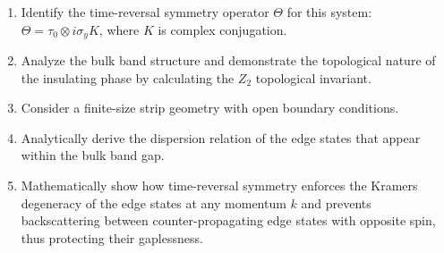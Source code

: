 \documentclass[a4paper,12pt]{article}
\begin{document}
\begin{enumerate}
    \item Identify the time-reversal symmetry operator $\Theta$ for this system: $\Theta = \tau_0 \otimes i\sigma_y K$, where $K$ is complex conjugation.

    \item Analyze the bulk band structure and demonstrate the topological nature of the insulating phase by calculating the $Z_2$ topological invariant.

    \item Consider a finite-size strip geometry with open boundary conditions.

    \item Analytically derive the dispersion relation of the edge states that appear within the bulk band gap.

    \item Mathematically show how time-reversal symmetry enforces the Kramers degeneracy of the edge states at any momentum $k$ and prevents backscattering between counter-propagating edge states with opposite spin, thus protecting their gaplessness.
\end{enumerate}
\end{document}
